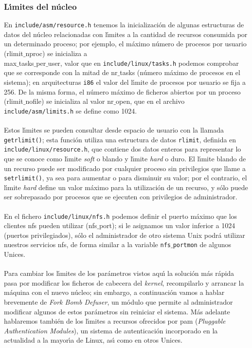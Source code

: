 \subsubsection{L\'{\i}mites del n\'ucleo}
En {\tt include/asm/resource.h} tenemos la inicializaci\'on de algunas 
estructuras de datos del n\'ucleo relacionadas con l\'{\i}mites a la cantidad de
recursos consumida por un determinado proceso; por ejemplo, el m\'aximo n\'umero
de procesos por usuario ({\sc rlimit$\_$nproc}) se inicializa a {\sc \\
max$\_$tasks$\_$per$\_$user}, valor que en {\tt include/linux/tasks.h} podemos
comprobar que se corresponde con la mitad de {\sc nr$\_$tasks} (n\'umero 
m\'aximo de procesos en el sistema); en arquitecturas {\tt i86} el valor del
l\'{\i}mite de procesos por usuario se fija a 256. 
De la misma forma, el n\'umero m\'aximo de ficheros abiertos por un proceso
({\sc rlimit$\_$nofile}) se inicializa al valor {\sc nr$\_$open}, que en
el archivo {\tt include/asm/limits.h} se define como 1024.\\
\\Estos l\'{\i}mites se pueden consultar desde espacio de usuario con la llamada
{\tt getrlimit()}; esta funci\'on utiliza una estructura de datos {\tt rlimit},
definida en {\tt include/linux/resource.h}, que contiene dos datos enteros para
representar lo que se conoce como l\'{\i}mite {\it soft} o blando y l\'{\i}mite
{\it hard} o duro. El l\'{\i}mite blando de un recurso puede ser modificado
por cualquier proceso sin privilegios que llame a {\tt setrlimit()}, ya sea
para aumentar o para disminuir su valor; por el contrario, el l\'{\i}mite {\it
hard} define un valor m\'aximo para la utilizaci\'on de un recurso, y s\'olo
puede ser sobrepasado por procesos que se ejecuten con privilegios de
administrador.\\
\\En el fichero {\tt include/linux/nfs.h} podemos definir el puerto m\'aximo
que los clientes {\sc nfs} pueden utilizar ({\sc nfs$\_$port}); si le asignamos
un valor inferior a 1024 (puertos privilegiados), s\'olo el administrador de 
otro sistema Unix podr\'a utilizar nuestros servicios {\sc nfs}, de forma 
similar a la variable {\tt nfs$\_$portmon} de algunos Unices.\\
\\Para cambiar los l\'{\i}mites de los par\'ametros vistos aqu\'{\i} la
soluci\'on m\'as r\'apida pasa por modificar los ficheros de cabecera del {\it
kernel}, recompilarlo y arrancar la m\'aquina con el nuevo n\'ucleo; sin 
embargo, a continuaci\'on vamos a hablar brevemente de {\it Fork Bomb Defuser},
un m\'odulo que permite al administrador modificar algunos de estos par\'ametros
sin reiniciar el sistema. M\'as adelante hablaremos tambi\'en de los 
l\'{\i}mites a recursos ofrecidos por {\sc pam} ({\it Pluggable Authentication
Modules}), un sistema de autenticaci\'on incorporado en la actualidad a la 
mayor\'{\i}a de Linux, as\'{\i} como en otros Unices. 
